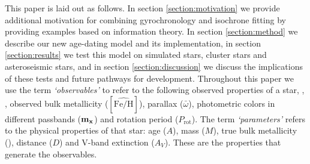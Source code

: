 This paper is laid out as follows.
In section \ref{section:motivation} we provide additional motivation for
combining gyrochronology and isochrone fitting by providing examples based
on information theory.
In section \ref{section:method} we describe our new age-dating model and its
implementation, in section \ref{section:results} we test this model on
simulated stars, cluster stars and asteroseismic stars, and in section
\ref{section:discussion} we discuss the implications of these tests and future
pathways for development.
Throughout this paper we use the term {\it `observables'} to refer to the
following observed properties of a star, \teff, \logg, observed bulk
metallicity ($[\hat{\mathrm{Fe/H}}]$), parallax ($\bar{\omega}$), photometric
colors in different passbands ($\bf{m_x}$) and rotation period
($P_{\mathrm{rot}}$).
The term {\it `parameters'} refers to the physical properties of that star:
age ($A$), mass ($M$), true bulk metallicity (\feh), distance ($D$) and V-band
extinction ($A_V$).
These are the properties that generate the observables.
